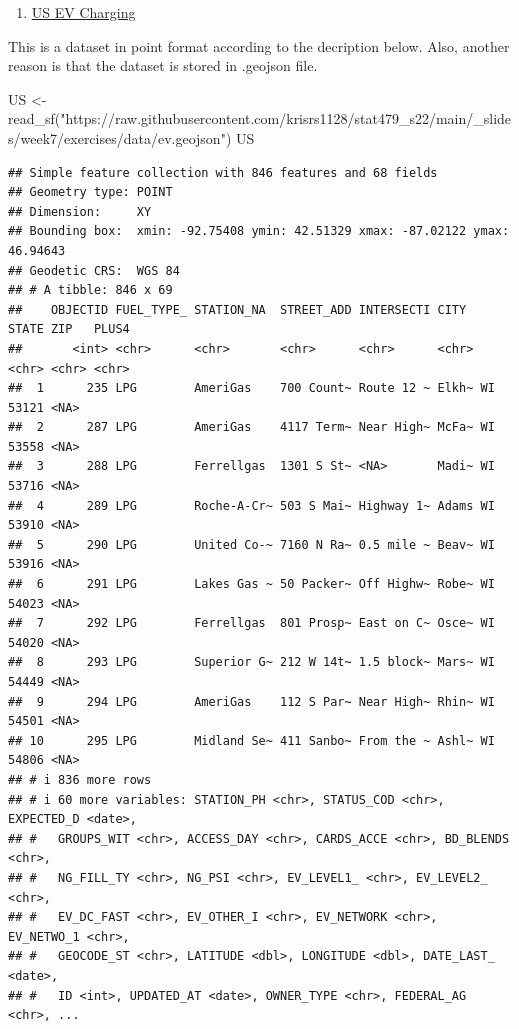 \documentclass[
]{article}
\newenvironment{Shaded}{\begin{snugshade}}{\end{snugshade}}
\newcommand{\FunctionTok}[1]{\textcolor[rgb]{0.00,0.00,0.00}{#1}}
\newcommand{\NormalTok}[1]{#1}
\newcommand{\OtherTok}[1]{\textcolor[rgb]{0.56,0.35,0.01}{#1}}
\newcommand{\StringTok}[1]{\textcolor[rgb]{0.31,0.60,0.02}{#1}}
\providecommand{\tightlist}{%
  \setlength{\itemsep}{0pt}\setlength{\parskip}{0pt}}
\begin{document}
\begin{enumerate}
\def\labelenumi{\alph{enumi}.}
\setcounter{enumi}{3}
\tightlist
\item
  \href{https://raw.githubusercontent.com/krisrs1128/stat479_s22/main/_slides/week7/exercises/data/ev.geojson}{US
  EV Charging}
\end{enumerate}

This is a dataset in point format according to the decription below.
Also, another reason is that the dataset is stored in .geojson file.

\begin{Shaded}
\begin{Highlighting}[]
\NormalTok{US }\OtherTok{\textless{}{-}} \FunctionTok{read\_sf}\NormalTok{(}\StringTok{"https://raw.githubusercontent.com/krisrs1128/stat479\_s22/main/\_slides/week7/exercises/data/ev.geojson"}\NormalTok{)}
\NormalTok{US}
\end{Highlighting}
\end{Shaded}

\begin{verbatim}
## Simple feature collection with 846 features and 68 fields
## Geometry type: POINT
## Dimension:     XY
## Bounding box:  xmin: -92.75408 ymin: 42.51329 xmax: -87.02122 ymax: 46.94643
## Geodetic CRS:  WGS 84
## # A tibble: 846 x 69
##    OBJECTID FUEL_TYPE_ STATION_NA  STREET_ADD INTERSECTI CITY  STATE ZIP   PLUS4
##       <int> <chr>      <chr>       <chr>      <chr>      <chr> <chr> <chr> <chr>
##  1      235 LPG        AmeriGas    700 Count~ Route 12 ~ Elkh~ WI    53121 <NA> 
##  2      287 LPG        AmeriGas    4117 Term~ Near High~ McFa~ WI    53558 <NA> 
##  3      288 LPG        Ferrellgas  1301 S St~ <NA>       Madi~ WI    53716 <NA> 
##  4      289 LPG        Roche-A-Cr~ 503 S Mai~ Highway 1~ Adams WI    53910 <NA> 
##  5      290 LPG        United Co-~ 7160 N Ra~ 0.5 mile ~ Beav~ WI    53916 <NA> 
##  6      291 LPG        Lakes Gas ~ 50 Packer~ Off Highw~ Robe~ WI    54023 <NA> 
##  7      292 LPG        Ferrellgas  801 Prosp~ East on C~ Osce~ WI    54020 <NA> 
##  8      293 LPG        Superior G~ 212 W 14t~ 1.5 block~ Mars~ WI    54449 <NA> 
##  9      294 LPG        AmeriGas    112 S Par~ Near High~ Rhin~ WI    54501 <NA> 
## 10      295 LPG        Midland Se~ 411 Sanbo~ From the ~ Ashl~ WI    54806 <NA> 
## # i 836 more rows
## # i 60 more variables: STATION_PH <chr>, STATUS_COD <chr>, EXPECTED_D <date>,
## #   GROUPS_WIT <chr>, ACCESS_DAY <chr>, CARDS_ACCE <chr>, BD_BLENDS <chr>,
## #   NG_FILL_TY <chr>, NG_PSI <chr>, EV_LEVEL1_ <chr>, EV_LEVEL2_ <chr>,
## #   EV_DC_FAST <chr>, EV_OTHER_I <chr>, EV_NETWORK <chr>, EV_NETWO_1 <chr>,
## #   GEOCODE_ST <chr>, LATITUDE <dbl>, LONGITUDE <dbl>, DATE_LAST_ <date>,
## #   ID <int>, UPDATED_AT <date>, OWNER_TYPE <chr>, FEDERAL_AG <chr>, ...
\end{verbatim}
\end{document}
